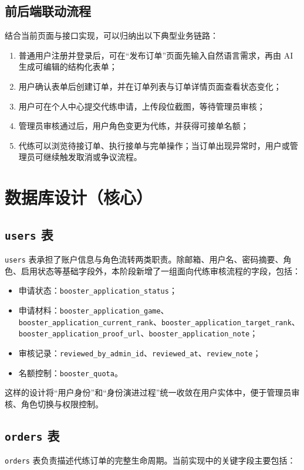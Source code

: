 ﻿\documentclass[12pt,a4paper]{ctexart}
\begin{document}
\subsection{前后端联动流程}
结合当前页面与接口实现，可以归纳出以下典型业务链路：

\begin{enumerate}[leftmargin=2em]
  \item 普通用户注册并登录后，可在“发布订单”页面先输入自然语言需求，再由 AI 生成可编辑的结构化表单；
  \item 用户确认表单后创建订单，并在订单列表与订单详情页面查看状态变化；
  \item 用户可在个人中心提交代练申请，上传段位截图，等待管理员审核；
  \item 管理员审核通过后，用户角色变更为代练，并获得可接单名额；
  \item 代练可以浏览待接订单、执行接单与完单操作；当订单出现异常时，用户或管理员可继续触发取消或争议流程。
\end{enumerate}

\section{数据库设计（核心）}

\subsection{\texttt{users} 表}
\texttt{users} 表承担了账户信息与角色流转两类职责。除邮箱、用户名、密码摘要、角色、启用状态等基础字段外，本阶段新增了一组面向代练审核流程的字段，包括：

\begin{itemize}[leftmargin=2em]
  \item 申请状态：\texttt{booster\_application\_status}；
  \item 申请材料：\texttt{booster\_application\_game}、\texttt{booster\_application\_current\_rank}、\texttt{booster\_application\_target\_rank}、\texttt{booster\_application\_proof\_url}、\texttt{booster\_application\_note}；
  \item 审核记录：\texttt{reviewed\_by\_admin\_id}、\texttt{reviewed\_at}、\texttt{review\_note}；
  \item 名额控制：\texttt{booster\_quota}。
\end{itemize}

这样的设计将“用户身份”和“身份演进过程”统一收敛在用户实体中，便于管理员审核、角色切换与权限控制。

\subsection{\texttt{orders} 表}
\texttt{orders} 表负责描述代练订单的完整生命周期。当前实现中的关键字段主要包括：
\end{document}

